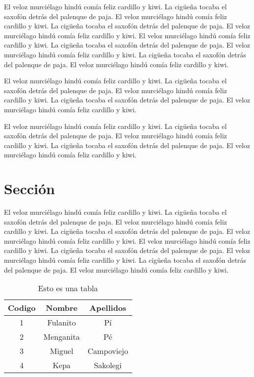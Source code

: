 El veloz murciélago hindú comía feliz cardillo y kiwi.  La cigüeña tocaba el saxofón detrás del palenque de paja.  El veloz murciélago hindú comía feliz cardillo y kiwi.  La cigüeña tocaba el saxofón detrás del palenque de paja.  El veloz murciélago hindú comía feliz cardillo y kiwi. El veloz murciélago hindú comía feliz cardillo y kiwi.  La cigüeña tocaba el saxofón detrás del palenque de paja.  El veloz murciélago hindú comía feliz cardillo y kiwi.  La cigüeña tocaba el saxofón detrás del palenque de paja.  El veloz murciélago hindú comía feliz cardillo y kiwi.


El veloz murciélago hindú comía feliz cardillo y kiwi.  La cigüeña tocaba el saxofón detrás del palenque de paja.  El veloz murciélago hindú comía feliz cardillo y kiwi.  La cigüeña tocaba el saxofón detrás del palenque de paja.  El veloz murciélago hindú comía feliz cardillo y kiwi.

El veloz murciélago hindú comía feliz cardillo y kiwi.  La cigüeña tocaba el saxofón detrás del palenque de paja.  El veloz murciélago hindú comía feliz cardillo y kiwi.  La cigüeña tocaba el saxofón detrás del palenque de paja.  El veloz murciélago hindú comía feliz cardillo y kiwi.

\section{Sección} 


El veloz murciélago hindú comía feliz cardillo y kiwi.  La cigüeña tocaba el saxofón detrás del palenque de paja.  El veloz murciélago hindú comía feliz cardillo y kiwi.  La cigüeña tocaba el saxofón detrás del palenque de paja.  El veloz murciélago hindú comía feliz cardillo y kiwi. El veloz murciélago hindú comía feliz cardillo y kiwi.  La cigüeña tocaba el saxofón detrás del palenque de paja.  El veloz murciélago hindú comía feliz cardillo y kiwi.  La cigüeña tocaba el saxofón detrás del palenque de paja.  El veloz murciélago hindú comía feliz cardillo y kiwi.

\begin{table}
\begin{center}
\begin{tabular}{|c|c|c|}
\hline Codigo & Nombre & Apellidos \\ 
\hline\hline 1 & Fulanito & Pí \\ 
\hline 2 & Menganita & Pé \\ 
\hline 3 & Miguel & Campoviejo \\ 
\hline 4 & Kepa & Sakolegi \\ 
\hline 
\end{tabular} 
\caption{Esto es una tabla}
\label{tbTabla4}
\end{center}
\end{table}

